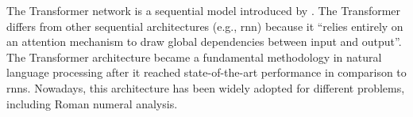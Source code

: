

The Transformer network is a sequential model introduced by
\textcite{vaswani2017attention}. The Transformer differs
from other sequential architectures (e.g., \gls{rnn}) because it
``relies entirely on an attention mechanism to draw global
dependencies between input and output''. The Transformer architecture became a fundamental methodology in natural language processing after it reached state-of-the-art performance in comparison to \glspl{rnn}. Nowadays, this architecture has been widely adopted for different problems, including Roman numeral analysis.
